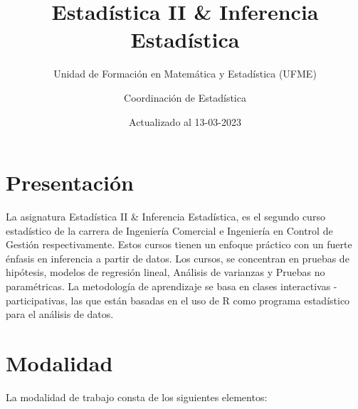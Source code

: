 \documentclass[
]{book}
\title{Estadística II \& Inferencia Estadística}
\subtitle{Unidad de Formación en Matemática y Estadística (UFME)}
\author{Coordinación de Estadística}
\date{Actualizado al 13-03-2023}
\theoremstyle{definition}
\theoremstyle{definition}
\theoremstyle{definition}
\theoremstyle{definition}
\theoremstyle{remark}
\begin{document}
\maketitle

{
\setcounter{tocdepth}{2}
\tableofcontents
}
\hypertarget{presentaciuxf3n}{%
\chapter*{Presentación}\label{presentaciuxf3n}}

La asignatura Estadística II \& Inferencia Estadística, es el segundo curso estadístico de la carrera de Ingeniería Comercial e Ingeniería en Control de Gestión respectivamente. Estos cursos tienen un enfoque práctico con un fuerte énfasis en inferencia a partir de datos. Los cursos, se concentran en pruebas de hipótesis, modelos de regresión lineal, Análisis de varianzas y Pruebas no paramétricas. La metodología de aprendizaje se basa en clases interactivas - participativas, las que están basadas en el uso de R como programa estadístico para el análisis de datos.

\hypertarget{modalidad}{%
\chapter*{Modalidad}\label{modalidad}}

La modalidad de trabajo consta de los siguientes elementos:
\end{document}
